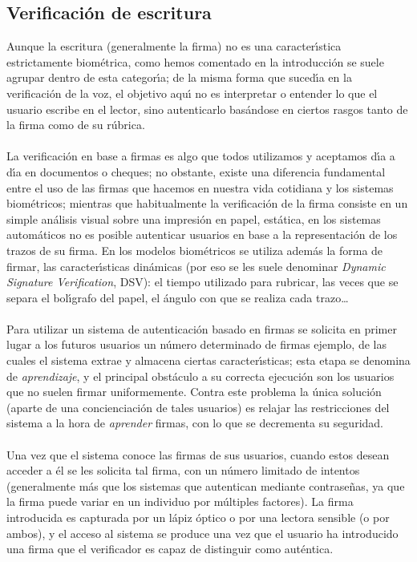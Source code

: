 \subsection{Verificaci\'on de escritura}  
Aunque la escritura (generalmente la firma) no es una caracter\'{\i}stica 
estrictamente biom\'etrica, como hemos comentado en la introducci\'on se suele 
agrupar dentro de esta categor\'{\i}a; de la misma forma que suced\'{\i}a en
la verificaci\'on de la voz, el objetivo aqu\'{\i} no es interpretar o entender 
lo que el usuario escribe en el lector, sino autenticarlo bas\'andose en 
ciertos rasgos tanto de la firma como de su r\'ubrica.\\
\\La verificaci\'on en base a firmas es algo que todos utilizamos y aceptamos 
d\'{\i}a a d\'{\i}a en documentos o cheques; no obstante, 
existe una diferencia fundamental entre el uso de las firmas que hacemos en
nuestra vida cotidiana y los sistemas biom\'etricos; mientras que habitualmente 
la verificaci\'on de la firma consiste en un simple an\'alisis visual sobre una 
impresi\'on en papel, est\'atica, en los sistemas autom\'aticos no es posible
autenticar usuarios en base a la representaci\'on de los trazos de su firma. En
los modelos biom\'etricos se utiliza adem\'as la forma de firmar, las 
caracter\'{\i}sticas din\'amicas (por eso se les suele denominar {\it Dynamic
Signature Verification}, DSV): el tiempo utilizado para rubricar, las veces que
se separa el bol\'{\i}grafo del papel, el \'angulo con que se realiza cada
trazo\ldots\\
\\Para utilizar un sistema de autenticaci\'on basado en firmas se solicita en 
primer lugar a los futuros usuarios un n\'umero determinado de firmas ejemplo, 
de las cuales el sistema extrae y almacena ciertas caracter\'{\i}sticas; esta 
etapa se denomina de {\it aprendizaje}, y el principal obst\'aculo a su correcta
ejecuci\'on son los usuarios que no suelen firmar uniformemente. Contra este
problema la \'unica soluci\'on (aparte de una concienciaci\'on de tales 
usuarios) es relajar las restricciones del sistema a la hora de {\it aprender}
firmas, con lo que se decrementa su seguridad.\\
\\Una vez que el sistema conoce las firmas de sus usuarios, cuando estos desean
acceder a \'el se les solicita tal firma, con un n\'umero limitado de intentos
(generalmente m\'as que los sistemas que autentican mediante contrase\~nas, ya
que la firma puede variar en un individuo por m\'ultiples factores). La firma
introducida es capturada por un l\'apiz \'optico o por una lectora sensible
(o por ambos), y el acceso al sistema se produce una vez que el usuario ha 
introducido una firma que el verificador es capaz de distinguir como 
aut\'entica.
